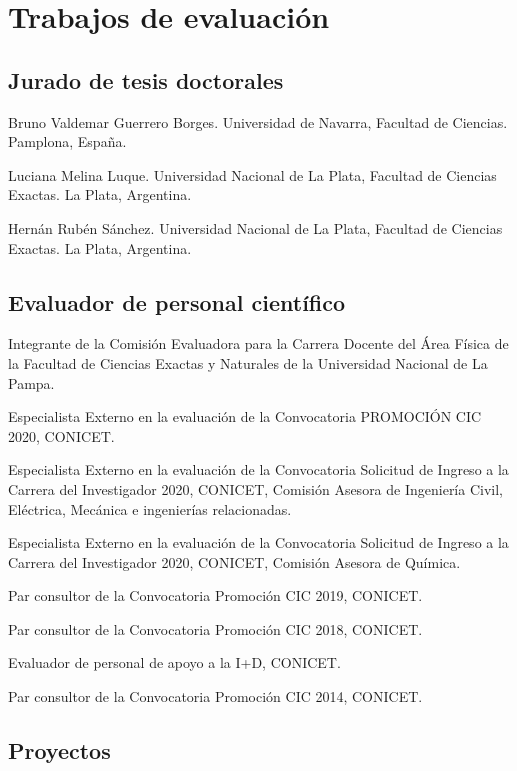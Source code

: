 \section{Trabajos de evaluación}

\subsection{Jurado de tesis doctorales}
 Bruno Valdemar Guerrero Borges. Universidad de Navarra, Facultad de Ciencias. Pamplona, España.

 Luciana Melina Luque. Universidad Nacional de La Plata, Facultad de Ciencias Exactas. La Plata, Argentina.

 Hernán Rubén Sánchez. Universidad Nacional de La Plata, Facultad de Ciencias Exactas. La Plata, Argentina.



\subsection{Evaluador de personal científico}

 Integrante de la Comisión Evaluadora para la Carrera Docente del Área Física de la Facultad de Ciencias Exactas y Naturales de la Universidad Nacional de La Pampa.

Especialista Externo en la evaluación de la Convocatoria PROMOCIÓN CIC 2020, CONICET.

 Especialista Externo en la evaluación de la Convocatoria Solicitud de Ingreso a la Carrera del Investigador 2020, CONICET,
 Comisión Asesora de Ingeniería Civil, Eléctrica, Mecánica e ingenierías relacionadas.

Especialista Externo en la evaluación de la Convocatoria Solicitud de Ingreso a la Carrera del Investigador 2020, CONICET, 
Comisión Asesora de Química.

 Par consultor de la Convocatoria Promoción CIC 2019, CONICET.

 Par consultor de la Convocatoria Promoción CIC 2018, CONICET.

 Evaluador de personal de apoyo a la I+D, CONICET.

 Par consultor de la Convocatoria Promoción CIC 2014, CONICET.



\subsection{Proyectos}

